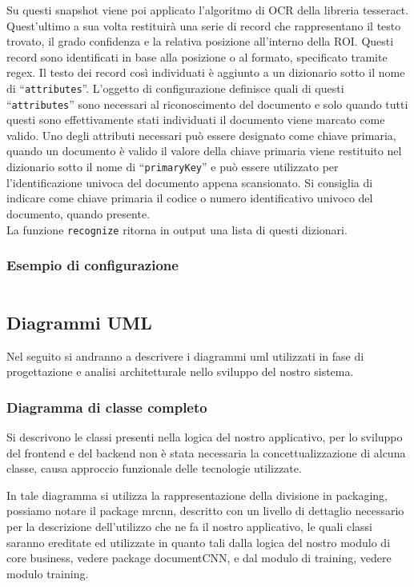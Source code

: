 \documentclass[12pt,a4paper]{article}
\begin{document}
Su questi snapshot viene poi applicato l'algoritmo di OCR della libreria
tesseract. Quest'ultimo a sua volta restituirà una serie di record che
rappresentano il testo trovato, il grado confidenza e la relativa
posizione all'interno della ROI. Questi record sono identificati in base
alla posizione o al formato, specificato tramite regex. Il testo dei
record così individuati è aggiunto a un dizionario sotto il nome di
``\texttt{attributes}''. L'oggetto di configurazione definisce quali di
questi ``\texttt{attributes}'' sono necessari al riconoscimento del
documento e solo quando tutti questi sono effettivamente stati
individuati il documento viene marcato come valido. Uno degli attributi
necessari può essere designato come chiave primaria, quando un documento
è valido il valore della chiave primaria viene restituito nel dizionario
sotto il nome di ``\texttt{primaryKey}'' e può essere utilizzato per
l'identificazione univoca del documento appena scansionato. Si consiglia
di indicare come chiave primaria il codice o numero identificativo
univoco del documento, quando presente.\\
La funzione \texttt{recognize} ritorna in output una lista di questi
dizionari.

\pagebreak

\subsubsection{Esempio di configurazione}
\inputminted{python}{config.py}

\subsection{Diagrammi UML}

Nel seguito si andranno a descrivere i diagrammi uml utilizzati in fase
di progettazione e analisi architetturale nello sviluppo del nostro
sistema.

\subsubsection{Diagramma di classe completo}

Si descrivono le classi presenti nella logica del nostro applicativo,
per lo sviluppo del frontend e del backend non è stata necessaria la
concettualizzazione di alcuna classe, causa approccio funzionale delle
tecnologie utilizzate.

In tale diagramma si utilizza la rappresentazione della divisione in
packaging, possiamo notare il package mrcnn, descritto con un livello di dettaglio
necessario per la descrizione dell'utilizzo che ne fa il nostro
applicativo, le quali classi saranno ereditate ed utilizzate in quanto
tali dalla logica del nostro modulo di core business, vedere package
documentCNN, e dal modulo di training, vedere modulo training.
\end{document}
